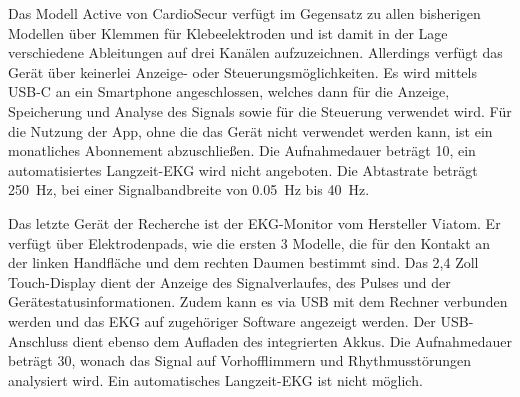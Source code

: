 Das Modell Active von CardioSecur verfügt im Gegensatz zu allen bisherigen Modellen über Klemmen für Klebeelektroden und ist damit in der Lage verschiedene Ableitungen auf drei Kanälen aufzuzeichnen. Allerdings verfügt das Gerät über keinerlei Anzeige- oder Steuerungsmöglichkeiten. Es wird mittels USB-C an ein Smartphone angeschlossen, welches dann für die Anzeige, Speicherung und Analyse des Signals sowie für die Steuerung verwendet wird. Für die Nutzung der App, ohne die das Gerät nicht verwendet werden kann, ist ein monatliches Abonnement abzuschließen. Die Aufnahmedauer beträgt \SI{10}{\sec}, ein automatisiertes Langzeit-EKG wird nicht angeboten. Die Abtastrate beträgt \SI{250}{\hertz}, bei einer Signalbandbreite von \SI{0.05} {\hertz} bis \SI{40} {\hertz}.

Das letzte Gerät der Recherche ist der EKG-Monitor vom Hersteller Viatom. Er verfügt über Elektrodenpads, wie die ersten 3 Modelle, die für den Kontakt an der linken Handfläche und dem rechten Daumen bestimmt sind. Das 2,4 Zoll Touch-Display dient der Anzeige des Signalverlaufes, des Pulses und der Gerätestatusinformationen. Zudem kann es via USB mit dem Rechner verbunden werden und das EKG auf zugehöriger Software angezeigt werden. Der USB-Anschluss dient ebenso dem Aufladen des integrierten Akkus. Die Aufnahmedauer beträgt \SI{30}{\sec}, wonach das Signal auf Vorhofflimmern und Rhythmusstörungen analysiert wird. Ein automatisches Langzeit-EKG ist nicht möglich. 

